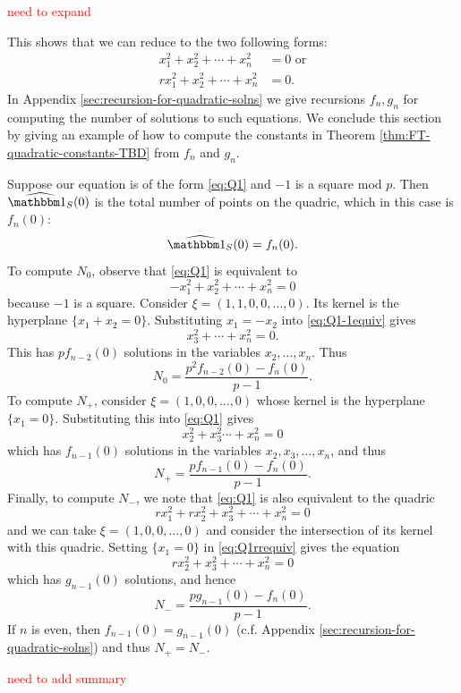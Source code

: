 \textcolor{red}{need to expand}

This shows that we can reduce to the two following forms:
\begin{align}
x_1^2 + x_2^2 + \cdots + x_n^2 &= 0\text{ or} \tag{Q1}\label{eq:Q1}\\ 
rx_1^2 + x_2^2 + \cdots + x_n^2 &= 0. \tag{Q2}\label{eq:Q2}
\end{align}
In Appendix \ref{sec:recursion-for-quadratic-solns} we give recursions $f_n, g_n$ for computing the number of solutions to such equations. We conclude this section by giving an example of how to compute the constants in Theorem \ref{thm:FT-quadratic-constants-TBD} from $f_n$ and $g_n$.

\begin{example}
	Suppose our equation is of the form \eqref{eq:Q1} and $-1$ is a square mod $p$. Then $\widehat{\IND_S}(0)$ is the total number of points on the quadric, which in this case is $f_n (0)$:
	\[
		\widehat{\IND_S}(0) = f_n(0).
	\]
	To compute $N_0$, observe that \eqref{eq:Q1} is equivalent to
	\begin{equation}\label{eq:Q1-1equiv}
		-x_1^2 + x_2^2 + \cdots + x_n^2 = 0
	\end{equation}
	because $-1$ is a square. Consider $\xi = (1,1,0,0,\ldots,0)$. Its kernel is the hyperplane $\{x_1 + x_2 = 0\}$. Substituting $x_1 = -x_2$ into \eqref{eq:Q1-1equiv} gives
	\[
	x_3^2 + \cdots + x_n^2 = 0.
	\]
	This has $p f_{n-2}(0)$ solutions in the variables $x_2,\ldots,x_n$. Thus
	\[
	N_0 = \frac{p^2 f_{n-2}(0) - f_n(0)}{p-1}.
	\]
	To compute $N_+$, consider $\xi = (1,0,0,\ldots,0)$ whose kernel is the hyperplane $\{x_1 = 0\}$. Substituting this into \eqref{eq:Q1} gives
	\[
	x_2^2 + x_3^2 \cdots + x_n^2 = 0
	\]
	which has $f_{n-1}(0)$ solutions in the variables $x_2,x_3,\ldots,x_n$, and thus
	\[
	N_+ = \frac{p f_{n-1}(0) - f_n(0)}{p-1}.
	\]
	Finally, to compute $N_-$, we note that \eqref{eq:Q1} is also equivalent to the quadric
	\begin{equation}\label{eq:Q1rrequiv}
		rx_1^2 + rx_2^2 + x_3^2 + \cdots + x_n^2 = 0
	\end{equation}
	and we can take $\xi = (1,0,0,\ldots,0)$ and consider the intersection of its kernel with this quadric. Setting $\{x_1 = 0\}$ in \eqref{eq:Q1rrequiv} gives the equation
	\[
		rx_2^2 + x_3^2 + \cdots + x_n^2 = 0
	\]
	which has $g_{n-1}(0)$ solutions, and hence
	\[
		N_- = \frac{pg_{n-1}(0) - f_n(0)}{p-1}.
	\]
	If $n$ is even, then $f_{n-1}(0) = g_{n-1}(0)$ (c.f. Appendix \ref{sec:recursion-for-quadratic-solns}) and thus $N_+ = N_-$.
\end{example}

\textcolor{red}{need to add summary}